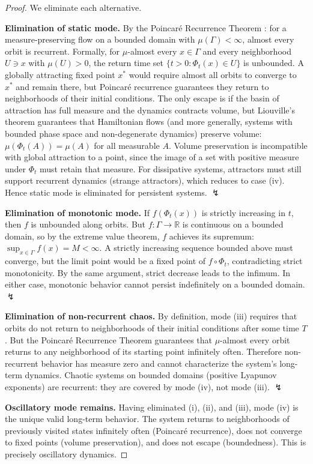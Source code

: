 \documentclass[11pt,twocolumn,a4paper]{article}
\newcommand{\R}{\mathbb{R}}
\begin{document}
\begin{proof}
We eliminate each alternative.

\textbf{Elimination of static mode.} By the Poincar\'{e} Recurrence
Theorem \citep{poincare1890}: for a measure-preserving flow on a
bounded domain with $\mu(\Gamma) < \infty$, almost every orbit is
recurrent. Formally, for $\mu$-almost every $x \in \Gamma$ and every
neighborhood $U \ni x$ with $\mu(U) > 0$, the return time set
$\{t > 0 : \Phi_t(x) \in U\}$ is unbounded. A globally attracting
fixed point $x^*$ would require almost all orbits to converge to $x^*$
and remain there, but Poincar\'{e} recurrence guarantees they return to
neighborhoods of their initial conditions. The only escape is if the
basin of attraction has full measure and the dynamics contracts volume,
but Liouville's theorem \citep{liouville1838} guarantees that
Hamiltonian flows (and more generally, systems with bounded phase
space and non-degenerate dynamics) preserve volume:
$\mu(\Phi_t(A)) = \mu(A)$ for all measurable $A$. Volume preservation
is incompatible with global attraction to a point, since the image of
a set with positive measure under $\Phi_t$ must retain that measure.
For dissipative systems, attractors must still support recurrent
dynamics (strange attractors), which reduces to case (iv). Hence static
mode is eliminated for persistent systems. $\lightning$

\textbf{Elimination of monotonic mode.} If $f(\Phi_t(x))$ is strictly
increasing in $t$, then $f$ is unbounded along orbits. But
$f : \Gamma \to \R$ is continuous on a bounded domain, so by the
extreme value theorem, $f$ achieves its supremum: $\sup_{x \in \Gamma}
f(x) = M < \infty$. A strictly increasing sequence bounded above must
converge, but the limit point would be a fixed point of $f \circ
\Phi_t$, contradicting strict monotonicity. By the same argument,
strict decrease leads to the infimum. In either case, monotonic
behavior cannot persist indefinitely on a bounded domain. $\lightning$

\textbf{Elimination of non-recurrent chaos.} By definition, mode (iii)
requires that orbits do not return to neighborhoods of their initial
conditions after some time $T$. But the Poincar\'{e} Recurrence Theorem
guarantees that $\mu$-almost every orbit returns to any neighborhood of
its starting point infinitely often. Therefore non-recurrent behavior
has measure zero and cannot characterize the system's long-term
dynamics. Chaotic systems on bounded domains (positive Lyapunov
exponents) are recurrent: they are covered by mode (iv), not
mode (iii). $\lightning$

\textbf{Oscillatory mode remains.} Having eliminated (i), (ii), and
(iii), mode (iv) is the unique valid long-term behavior. The system
returns to neighborhoods of previously visited states infinitely often
(Poincar\'{e} recurrence), does not converge to fixed points (volume
preservation), and does not escape (boundedness). This is precisely
oscillatory dynamics.
\end{proof}
\end{document}
